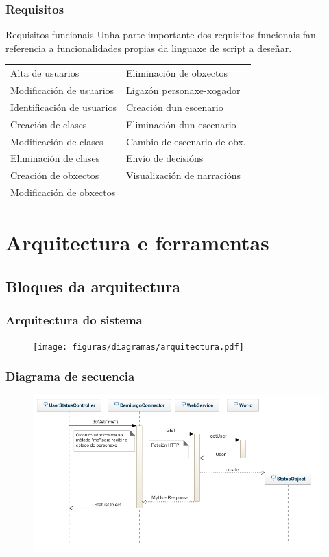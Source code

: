 \documentclass[12pt]{beamer}
\begin{document}
\begin{frame}
\frametitle{Requisitos}
\begin{block}{Requisitos funcionais}
Unha parte importante dos requisitos funcionais fan referencia a funcionalidades
propias da linguaxe de script a deseñar.
\end{block}
\begin{tabular}{| l | l | }
\hline
Alta de usuarios & \alert{Eliminación de obxectos} \\
Modificación de usuarios & \alert{Ligazón personaxe-xogador} \\
Identificación de usuarios & Creación dun escenario \\
\alert{Creación de clases} & Eliminación dun escenario \\
\alert{Modificación de clases} & \alert{Cambio de escenario de obx.} \\
Eliminación de clases & Envío de decisións \\
\alert{Creación de obxectos} & Visualización de narracións \\
\alert{Modificación de obxectos} & \\
\hline
\end{tabular}
\end{frame}

\section{Arquitectura e ferramentas}
\subsection{Bloques da arquitectura}

\begin{frame}[plain]
\frametitle{Arquitectura do sistema}
\begin{figure}
\texttt{[image: figuras/diagramas/arquitectura.pdf]} 
\end{figure}
\end{frame}

\begin{frame}
\frametitle{Diagrama de secuencia}
\begin{figure}
\includegraphics[scale=0.5]{figuras/diagramas/secuencia.png} 
\end{figure}
\end{frame}
\end{document}
